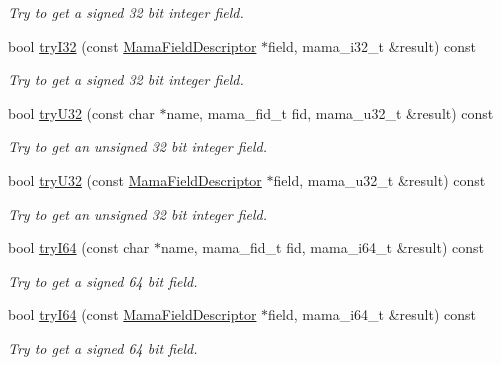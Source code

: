 \begin{DoxyCompactItemize}
\begin{DoxyCompactList}\small\item\em Try to get a signed 32 bit integer field. \item\end{DoxyCompactList}\item 
bool \hyperlink{classWombat_1_1MamaMsg_a0ddb06d9593997d9d840fe4e23d510bb}{tryI32} (const \hyperlink{classWombat_1_1MamaFieldDescriptor}{MamaFieldDescriptor} $\ast$field, mama\_\-i32\_\-t \&result) const 
\begin{DoxyCompactList}\small\item\em Try to get a signed 32 bit integer field. \item\end{DoxyCompactList}\item 
bool \hyperlink{classWombat_1_1MamaMsg_a38119970c0f4c3caa9f12f68a3ec0a82}{tryU32} (const char $\ast$name, mama\_\-fid\_\-t fid, mama\_\-u32\_\-t \&result) const 
\begin{DoxyCompactList}\small\item\em Try to get an unsigned 32 bit integer field. \item\end{DoxyCompactList}\item 
bool \hyperlink{classWombat_1_1MamaMsg_acad5bf883bc14323cd8896bde4e50f92}{tryU32} (const \hyperlink{classWombat_1_1MamaFieldDescriptor}{MamaFieldDescriptor} $\ast$field, mama\_\-u32\_\-t \&result) const 
\begin{DoxyCompactList}\small\item\em Try to get an unsigned 32 bit integer field. \item\end{DoxyCompactList}\item 
bool \hyperlink{classWombat_1_1MamaMsg_ae06ab152da80a5bcaba2e30465f25606}{tryI64} (const char $\ast$name, mama\_\-fid\_\-t fid, mama\_\-i64\_\-t \&result) const 
\begin{DoxyCompactList}\small\item\em Try to get a signed 64 bit field. \item\end{DoxyCompactList}\item 
bool \hyperlink{classWombat_1_1MamaMsg_a675d9b762142bd3bed9281f94cf8424b}{tryI64} (const \hyperlink{classWombat_1_1MamaFieldDescriptor}{MamaFieldDescriptor} $\ast$field, mama\_\-i64\_\-t \&result) const 
\begin{DoxyCompactList}\small\item\em Try to get a signed 64 bit field. \item\end{DoxyCompactList}\item 

\end{DoxyCompactItemize}
